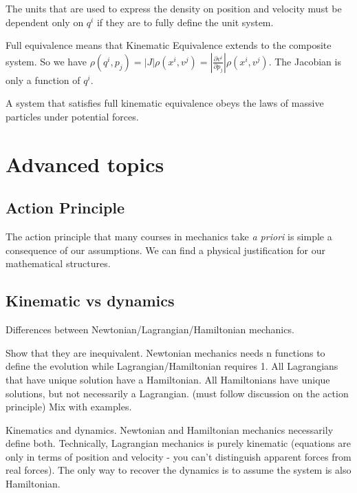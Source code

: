 \documentclass{article}
\begin{document}
The units that are used to express the density on position and velocity must be dependent only on $q^i$ if they are to fully define the unit system.

\begin{defn}
	Full equivalence means that Kinematic Equivalence extends to the composite system. So we have $\rho(q^i,p_j) = \left|J\right|\rho(x^i,v^j) = \left|\frac{\partial v^i}{\partial p_j}\right|\rho(x^i,v^j)$. The Jacobian is only a function of $q^i$.
\end{defn}

\begin{prop}
	A system that satisfies full kinematic equivalence obeys the laws of massive particles under potential forces.
\end{prop}

\section{Advanced topics}

\subsection{Action Principle}

The action principle that many courses in mechanics take \emph{a priori} is simple a consequence of our assumptions. We can find a physical justification for our mathematical structures.

\subsection{Kinematic vs dynamics}

Differences between Newtonian/Lagrangian/Hamiltonian mechanics.

Show that they are inequivalent. Newtonian mechanics needs n functions to define the evolution while Lagrangian/Hamiltonian requires 1. All Lagrangians that have unique solution have a Hamiltonian. All Hamiltonians have unique solutions, but not necessarily a Lagrangian. (must follow discussion on the action principle) Mix with examples.

Kinematics and dynamics. Newtonian and Hamiltonian mechanics necessarily define both. Technically, Lagrangian mechanics is purely kinematic (equations are only in terms of position and velocity - you can't distinguish apparent forces from real forces). The only way to recover the dynamics is to assume the system is also Hamiltonian.
\end{document}
